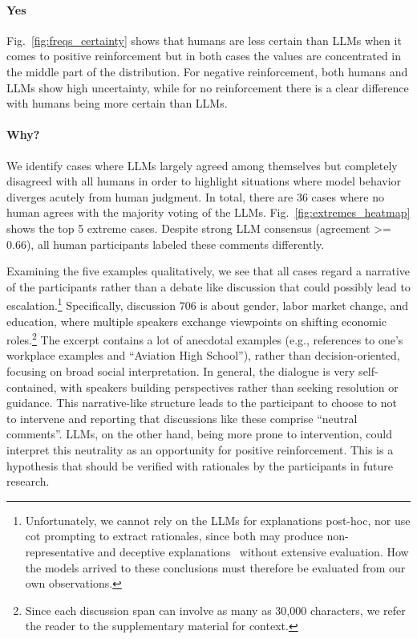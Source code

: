 \documentclass[11pt]{article}
\theoremstyle{definition}
\theoremstyle{plain}
\begin{document}
\paragraph{Yes} Fig.~\ref{fig:freqs_certainty} shows that humans are less certain than LLMs when it comes to positive reinforcement but in both cases the values are concentrated in the middle part of the distribution. For negative reinforcement, both humans and LLMs show high uncertainty, while for no reinforcement there is a clear difference with humans being more certain than LLMs.

\paragraph{Why?} We identify cases where LLMs largely agreed among themselves but completely disagreed with all humans in order to highlight situations where model behavior diverges acutely from human judgment. In total, there are 36 cases where no human agrees with the majority voting of the LLMs. Fig.~\ref{fig:extremes_heatmap} shows the top 5 extreme cases. Despite strong LLM consensus (agreement >= 0.66), all human participants labeled these comments differently. 

Examining the five examples qualitatively, we see that all cases regard a narrative of the participants rather than a debate like discussion that could possibly lead to escalation.\footnote{Unfortunately, we cannot rely on the LLMs for explanations post-hoc, nor use \ac{cot} prompting to extract rationales, since both may produce non-representative and deceptive explanations~\citep{zaman-srivastava-2026-chain, turpin2023language} without extensive evaluation. How the models arrived to these conclusions must therefore be evaluated from our own observations. } Specifically, discussion 706 is about gender, labor market change, and education, where multiple speakers exchange viewpoints on shifting economic roles.\footnote{Since each discussion span can involve as many as 30{,}000 characters, we refer the reader to the supplementary material for context.} The excerpt contains a lot of anecdotal examples (e.g., references to one's workplace examples and ``Aviation High School''), rather than decision-oriented, focusing on broad social interpretation. In general, the dialogue is very self-contained, with speakers building perspectives rather than seeking resolution or guidance. This narrative-like structure leads to the participant to choose to not to intervene and reporting that discussions like these comprise ``neutral comments''. LLMs, on the other hand, being more prone to intervention, could interpret this neutrality as an opportunity for positive reinforcement. This is a hypothesis that should be verified with rationales by the participants in future research.
\end{document}
